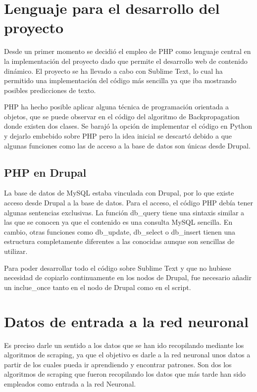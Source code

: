 

\section{Lenguaje para el desarrollo del proyecto}

Desde un primer momento se decidió el empleo de PHP como lenguaje central en la implementación del proyecto dado que permite el desarrollo web de contenido dinámico. El proyecto se ha llevado a cabo con Sublime Text, lo cual ha permitido una implementación del código más sencilla ya que iba mostrando posibles predicciones de texto.

PHP ha hecho posible aplicar alguna técnica de programación orientada a objetos, que se puede observar en el código del algoritmo de Backpropagation donde existen dos clases.
Se barajó la opción de implementar el código en Python y dejarlo embebido sobre PHP pero la idea inicial se descartó debido a que algunas funciones como las de acceso a la base de datos son únicas desde Drupal.

\subsection{PHP en Drupal}
La base de datos de MySQL estaba vinculada con Drupal, por lo que existe acceso desde Drupal a la base de datos. Para el acceso, el código PHP debía tener algunas sentencias exclusivas. La función db\_query tiene una sintaxis similar a las que se conocen ya que el contenido es una consulta MySQL sencilla. En cambio, otras funciones como db\_update, db\_select o db\_insert tienen una estructura completamente diferentes a las conocidas aunque son sencillas de utilizar.

Para poder desarrollar todo el código sobre Sublime Text y que no hubiese necesidad de copiarlo continuamente en los nodos de Drupal, fue necesario añadir un inclue\_once tanto en el nodo de Drupal como en el script.

\section{Datos de entrada a la red neuronal}
Es preciso darle un sentido a los datos que se han ido recopilando mediante los algoritmos de scraping, ya que el objetivo es darle a la red neuronal unos datos a partir de los cuales pueda ir aprendiendo y encontrar patrones. Son dos los algoritmos de scraping que fueron recopilando los datos que más tarde han sido empleados como entrada a la red Neuronal.

